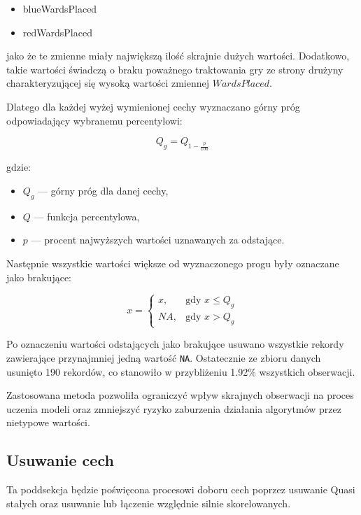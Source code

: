 \documentclass[twoside]{customStyle}
\begin{document}
\begin{itemize}
	\item blueWardsPlaced
	\item redWardsPlaced
\end{itemize}

jako że te zmienne miały największą ilość skrajnie dużych wartości. Dodatkowo, takie wartości świadczą o braku poważnego traktowania gry ze strony drużyny charakteryzującej się wysoką wartości zmiennej $WardsPlaced$.

Dlatego dla każdej wyżej wymienionej cechy wyznaczano górny próg odpowiadający wybranemu percentylowi:

\begin{equation}
Q_{g} = Q_{1-\frac{p}{100}}
\end{equation}

gdzie:
\begin{itemize}
	\item $Q_{g}$ --- górny próg dla danej cechy,
	\item $Q$ --- funkcja percentylowa,
	\item $p$ --- procent najwyższych wartości uznawanych za odstające.
\end{itemize}

Następnie wszystkie wartości większe od wyznaczonego progu były oznaczane jako brakujące:

\begin{equation}
x =
\begin{cases}
	x, & \text{gdy } x \leq Q_{g} \\
	NA, & \text{gdy } x > Q_{g}
\end{cases}
\end{equation}

Po oznaczeniu wartości odstających jako brakujące usuwano wszystkie rekordy zawierające przynajmniej jedną wartość \texttt{NA}. Ostatecznie ze zbioru danych usunięto 190 rekordów, co stanowiło w przybliżeniu 1.92\% wszystkich obserwacji.

Zastosowana metoda pozwoliła ograniczyć wpływ skrajnych obserwacji na proces uczenia modeli oraz zmniejszyć ryzyko zaburzenia działania algorytmów przez nietypowe wartości.
\newpage

\subsection{Usuwanie cech}
\indent Ta poddsekcja będzie poświęcona procesowi doboru cech poprzez usuwanie Quasi stałych oraz usuwanie lub łączenie względnie silnie skorelowanych.
\end{document}
